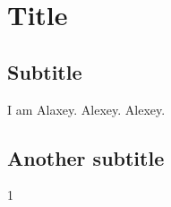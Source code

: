 \documentclass{article}
\begin{document}
\section{Title}

\subsection{Subtitle}
I am Alaxey. Alexey. Alexey.
\subsection{Another subtitle}

1
\end{document}
